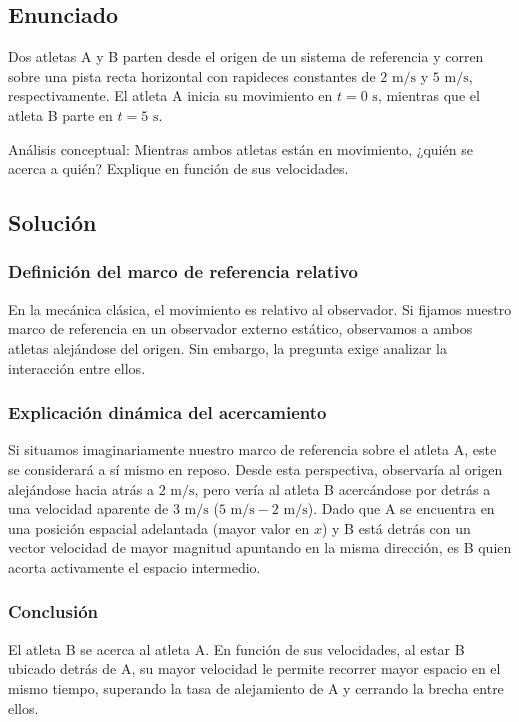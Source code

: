 \documentclass[12pt, a4paper]{article}
\begin{document}
\newpage
\subsection*{Enunciado}
Dos atletas A y B parten desde el origen de un sistema de referencia y corren sobre una pista recta horizontal con rapideces constantes de $2\text{ m/s}$ y $5\text{ m/s}$, respectivamente. El atleta A inicia su movimiento en $t = 0\text{ s}$, mientras que el atleta B parte en $t = 5\text{ s}$.

Análisis conceptual: Mientras ambos atletas están en movimiento, ¿quién se acerca a quién? Explique en función de sus velocidades.

\subsection*{Solución}

\subsubsection*{Definición del marco de referencia relativo}
En la mecánica clásica, el movimiento es relativo al observador. Si fijamos nuestro marco de referencia en un observador externo estático, observamos a ambos atletas alejándose del origen. Sin embargo, la pregunta exige analizar la interacción entre ellos. 

\subsubsection*{Explicación dinámica del acercamiento}
Si situamos imaginariamente nuestro marco de referencia sobre el atleta A, este se considerará a sí mismo en reposo. Desde esta perspectiva, observaría al origen alejándose hacia atrás a $2\text{ m/s}$, pero vería al atleta B acercándose por detrás a una velocidad aparente de $3\text{ m/s}$ ($5\text{ m/s} - 2\text{ m/s}$). Dado que A se encuentra en una posición espacial adelantada (mayor valor en $x$) y B está detrás con un vector velocidad de mayor magnitud apuntando en la misma dirección, es B quien acorta activamente el espacio intermedio.

\subsubsection*{Conclusión}
El atleta B se acerca al atleta A. En función de sus velocidades, al estar B ubicado detrás de A, su mayor velocidad le permite recorrer mayor espacio en el mismo tiempo, superando la tasa de alejamiento de A y cerrando la brecha entre ellos.
\end{document}
